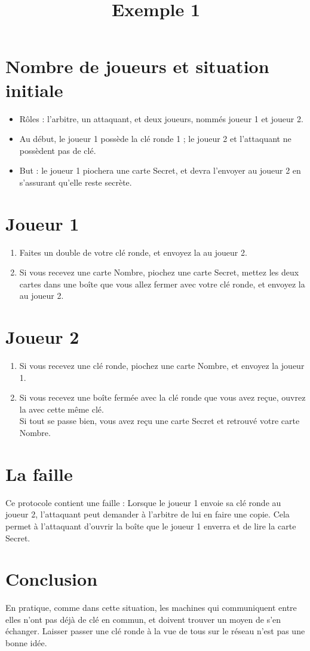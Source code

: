 \documentclass[a4paper,10pt]{article}
\title{Exemple 1}
\date{}
\begin{document}
\maketitle

\section{Nombre de joueurs et situation initiale}
\begin{itemize}
	\item Rôles : l'arbitre, un attaquant, et deux joueurs, nommés joueur 1 et joueur 2.
	\item Au début, le joueur 1 possède la clé ronde 1 ; le joueur 2 et l'attaquant ne possèdent pas de clé.
	\item But : le joueur 1 piochera une carte Secret, et devra l'envoyer au joueur 2 en s'assurant qu'elle reste secrète.
\end{itemize}




\section{Joueur 1}
\begin{enumerate}
	\item Faites un double de votre clé ronde, et envoyez la au joueur 2.
	\item Si vous recevez une carte Nombre, piochez une carte Secret, mettez les deux cartes dans une boîte que vous allez fermer avec votre clé ronde, et envoyez la au joueur 2.
\end{enumerate}

\section{Joueur 2}
\begin{enumerate}
	\item Si vous recevez une clé ronde, piochez une carte Nombre, et envoyez la joueur 1.
	\item Si vous recevez une boîte fermée avec la clé ronde que vous avez reçue, ouvrez la avec cette même clé.\\ Si tout se passe bien, vous avez reçu une carte Secret et retrouvé votre carte Nombre.
\end{enumerate}

\section{La faille}
Ce protocole contient une faille :
Lorsque le joueur 1 envoie sa clé ronde au joueur 2, l'attaquant peut demander à l'arbitre de lui en faire une copie. Cela permet à l'attaquant d'ouvrir la boîte que le joueur 1 enverra et de lire la carte Secret.

\section{Conclusion}
En pratique, comme dans cette situation, les machines qui communiquent entre elles n'ont pas déjà de clé en commun, et doivent trouver un moyen de s'en échanger. Laisser passer une clé ronde à la vue de tous sur le réseau n'est pas une bonne idée.
\end{document}
